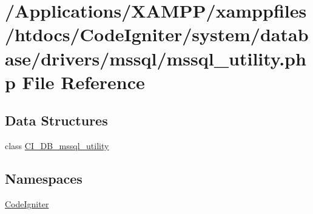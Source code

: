 \hypertarget{mssql__utility_8php}{}\section{/\+Applications/\+X\+A\+M\+P\+P/xamppfiles/htdocs/\+Code\+Igniter/system/database/drivers/mssql/mssql\+\_\+utility.php File Reference}
\label{mssql__utility_8php}
\subsection*{Data Structures}
\begin{DoxyCompactItemize}
\item 
class \mbox{\hyperlink{class_c_i___d_b__mssql__utility}{C\+I\+\_\+\+D\+B\+\_\+mssql\+\_\+utility}}
\end{DoxyCompactItemize}
\subsection*{Namespaces}
\begin{DoxyCompactItemize}
\item 
 \mbox{\hyperlink{namespace_code_igniter}{Code\+Igniter}}
\end{DoxyCompactItemize}
